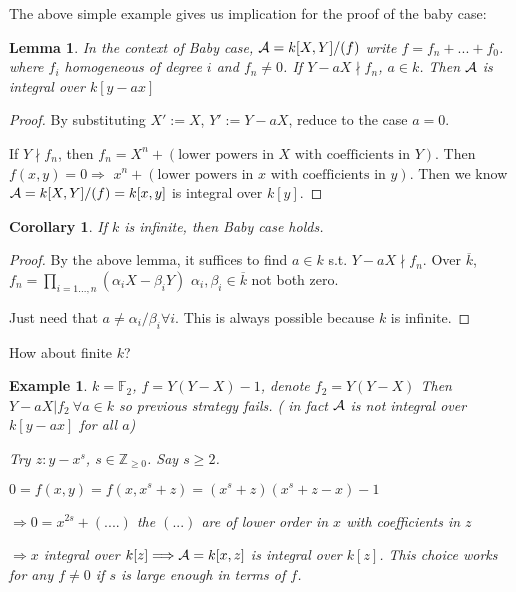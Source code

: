 \documentclass[11pt]{article}
\newtheorem{lemma}[thm]{Lemma}
\newtheorem{cor}[thm]{Corollary}
\newtheorem{ex}[thm]{Example}
\newcommand{\intg}{\mathbb Z}
\newcommand{\bbf}{\mathbb F}
\newcommand{\cala}{{\cal A}}
\newcommand{\Lrta}{\Longrightarrow}
\begin{document}
The above simple example gives us implication for the proof of the baby case:
\begin{lemma}
In the context of Baby case, $\cala=k[X,Y]/(f)$ write $f=f_n+...+f_0$. where $f_i$ homogeneous of degree $i$ and $f_n\neq 0$. If $Y-aX\nmid f_n$, $a\in k$. Then $\cala$ is integral over $k[y-ax]$
\end{lemma}
\begin{proof}
By substituting $X':=X$, $Y':=Y-aX$, reduce to the case $a=0$.

If $Y\nmid f_n$, then $f_n=X^{n}+(\text{lower powers in $X$ with coefficients in $Y$})$. Then $f(x,y)=0\Lrta$ $x^n+(\text{lower powers in $x$ with coefficients in $y$})$. Then we know $\cala=k[X,Y]/(f)=k[x,y]$ is integral over $k[y]$.
\end{proof}
\begin{cor}
If $k$ is infinite, then Baby case holds.
\end{cor}
\begin{proof}
By the above lemma, it suffices to find $a\in k$ s.t. $Y-aX\nmid f_n$. Over $\overline{k}$, $f_n=\prod_{i=1...,n} (\alpha_i X-\beta_i Y)$ $\alpha_i,\beta_i\in \overline{k}$ not both zero. 

Just need that $a\neq \alpha_i/\beta_i\forall i$. This is always possible because $k$ is infinite.
\end{proof}

How about finite $k$?

\begin{ex}
$k=\bbf_2$, $f=Y(Y-X)-1$, denote $f_2=Y(Y-X)$ Then $Y-aX|f_2\ \forall a\in k$ so previous strategy fails. ( in fact $\cala$ is not integral over $k[y-ax]$ for all $a$)

Try $z:y-x^s$, $s\in \intg_{\geq 0}$. Say $s\geq 2$.

$0=f(x,y)=f(x,x^s+z)=(x^s+z)(x^s+z-x)-1$

$\Lrta 0=x^{2s}+(....)$ the $(...)$ are of lower order in $x$ with coefficients in $z$

$\Lrta x$ integral over $k[z]\Lrta\cala=k[x,z]$ is integral over $k[z]$. This choice works for any $f\neq 0$ if $s$ is large enough in terms of $f$.
\end{ex}
\end{document}
